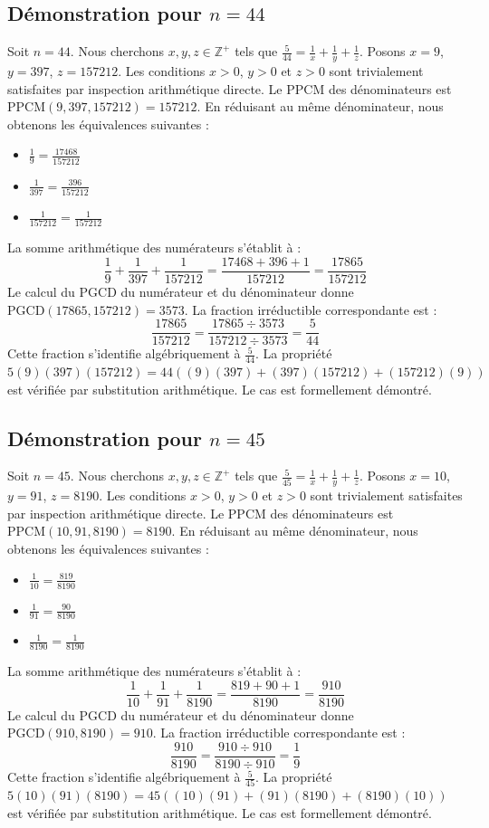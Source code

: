 \documentclass[12pt,a4paper]{article}
\begin{document}
\subsection{Démonstration pour $n = 44$}
Soit $n = 44$. Nous cherchons $x, y, z \in \mathbb{Z}^{+}$ tels que $\frac{5}{44} = \frac{1}{x} + \frac{1}{y} + \frac{1}{z}$.
Posons $x = 9$, $y = 397$, $z = 157212$.
Les conditions $x > 0$, $y > 0$ et $z > 0$ sont trivialement satisfaites par inspection arithmétique directe.
Le PPCM des dénominateurs est $\text{PPCM}(9, 397, 157212) = 157212$.
En réduisant au même dénominateur, nous obtenons les équivalences suivantes :
\begin{itemize}
    \item $\frac{1}{9} = \frac{17468}{157212}$
    \item $\frac{1}{397} = \frac{396}{157212}$
    \item $\frac{1}{157212} = \frac{1}{157212}$
\end{itemize}
La somme arithmétique des numérateurs s'établit à :
$$ \frac{1}{9} + \frac{1}{397} + \frac{1}{157212} = \frac{17468 + 396 + 1}{157212} = \frac{17865}{157212} $$
Le calcul du PGCD du numérateur et du dénominateur donne $\text{PGCD}(17865, 157212) = 3573$.
La fraction irréductible correspondante est :
$$ \frac{17865}{157212} = \frac{17865 \div 3573}{157212 \div 3573} = \frac{5}{44} $$
Cette fraction s'identifie algébriquement à $\frac{5}{44}$.
La propriété $5(9)(397)(157212) = 44((9)(397) + (397)(157212) + (157212)(9))$ est vérifiée par substitution arithmétique.
Le cas est formellement démontré.

\subsection{Démonstration pour $n = 45$}
Soit $n = 45$. Nous cherchons $x, y, z \in \mathbb{Z}^{+}$ tels que $\frac{5}{45} = \frac{1}{x} + \frac{1}{y} + \frac{1}{z}$.
Posons $x = 10$, $y = 91$, $z = 8190$.
Les conditions $x > 0$, $y > 0$ et $z > 0$ sont trivialement satisfaites par inspection arithmétique directe.
Le PPCM des dénominateurs est $\text{PPCM}(10, 91, 8190) = 8190$.
En réduisant au même dénominateur, nous obtenons les équivalences suivantes :
\begin{itemize}
    \item $\frac{1}{10} = \frac{819}{8190}$
    \item $\frac{1}{91} = \frac{90}{8190}$
    \item $\frac{1}{8190} = \frac{1}{8190}$
\end{itemize}
La somme arithmétique des numérateurs s'établit à :
$$ \frac{1}{10} + \frac{1}{91} + \frac{1}{8190} = \frac{819 + 90 + 1}{8190} = \frac{910}{8190} $$
Le calcul du PGCD du numérateur et du dénominateur donne $\text{PGCD}(910, 8190) = 910$.
La fraction irréductible correspondante est :
$$ \frac{910}{8190} = \frac{910 \div 910}{8190 \div 910} = \frac{1}{9} $$
Cette fraction s'identifie algébriquement à $\frac{5}{45}$.
La propriété $5(10)(91)(8190) = 45((10)(91) + (91)(8190) + (8190)(10))$ est vérifiée par substitution arithmétique.
Le cas est formellement démontré.
\end{document}
